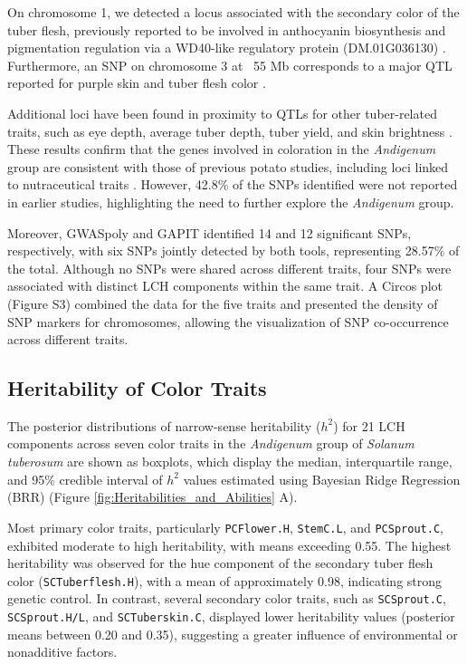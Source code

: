 \documentclass[pdflatex,sn-mathphys-ay]{sn-jnl}%
\begin{document}
On chromosome 1, we detected a locus associated with the secondary color of the tuber flesh, previously reported to be involved in anthocyanin biosynthesis and pigmentation regulation via a WD40-like regulatory protein (DM.01G036130) \citep{liu2020wd40, sajeevan2023comprehensive}. Furthermore, an SNP on chromosome 3 at ~55 Mb corresponds to a major QTL reported for purple skin and tuber flesh color \citep{pandey2021genetic, sharma2024genotyping}. 


Additional loci have been found in proximity to QTLs for other tuber-related traits, such as eye depth, average tuber depth, tuber yield, and skin brightness \citep{sharma2024genotyping,pandey2022genomic}. These results confirm that the genes involved in coloration in the \textit{Andigenum} group are consistent with those of previous potato studies, including loci linked to nutraceutical traits \citep{berdugo2023phenotypic,riveros2022uncovering,parra2019chromosomes,parra2021pathway}. However, 42.8\% of the SNPs identified were not reported in earlier studies, highlighting the need to further explore the \textit{Andigenum} group.



Moreover, GWASpoly and GAPIT identified 14 and 12 significant SNPs, respectively, with six SNPs jointly detected by both tools, representing 28.57\% of the total. Although no SNPs were shared across different traits, four SNPs were associated with distinct LCH components within the same trait. A Circos plot (Figure S3) combined the data for the five traits and presented the density of SNP markers for chromosomes, allowing the visualization of SNP co-occurrence across different traits.


\subsection{Heritability of Color Traits}



The posterior distributions of narrow-sense heritability ($h^2$) for 21 LCH components across seven color traits in the \textit{Andigenum} group of \textit{Solanum tuberosum} are shown as boxplots,  which display the median, interquartile range, and 95\% credible interval of $h^2$ values estimated using Bayesian Ridge Regression (BRR) (Figure \ref{fig:Heritabilities_and_Abilities} A).

Most primary color traits, particularly \texttt{PCFlower.H}, \texttt{StemC.L}, and \texttt{PCSprout.C}, exhibited moderate to high heritability, with means exceeding 0.55. The highest heritability was observed for the hue component of the secondary tuber flesh color (\texttt{SCTuberflesh.H}), with a mean of approximately 0.98, indicating strong genetic control. In contrast, several secondary color traits, such as \texttt{SCSprout.C}, \texttt{SCSprout.H/L}, and \texttt{SCTuberskin.C}, displayed lower heritability values (posterior means between 0.20 and 0.35), suggesting a greater influence of environmental or nonadditive factors.
\end{document}
